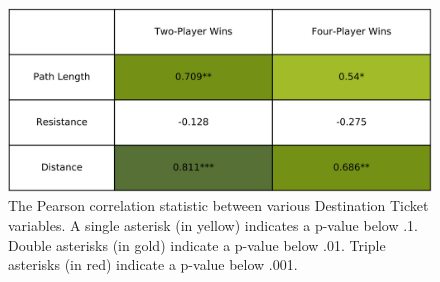 \begin{multicols}{2}
\begin{figure}[H]
    \centering
    \includegraphics[scale=.4]{figures/pearsons_table}
    \caption{The Pearson correlation statistic between
    various Destination Ticket variables.
    A single asterisk (in yellow) indicates a p-value
    below .1. Double asterisks (in gold) indicate a
    p-value below .01. Triple asterisks (in red)
    indicate a p-value below .001.}
    \label{fig:correlation_table}
\end{figure}

\end{multicols}
